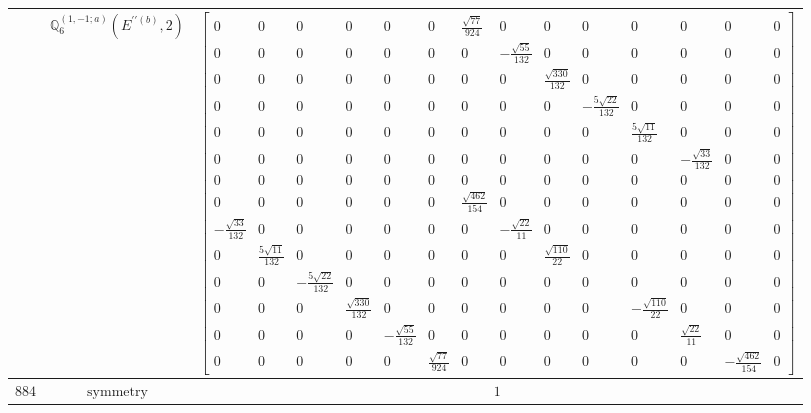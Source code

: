 \documentclass[fleqn,8pt,landscape]{jsarticle}
\begin{document}
\begin{longtable}{ccc}
$  $ & $ \mathbb{Q}_{6}^{(1,-1;a)}(E^{\prime\prime(b)},2) $ & $ \begin{bmatrix} 0 & 0 & 0 & 0 & 0 & 0 & \frac{\sqrt{77}}{924} & 0 & 0 & 0 & 0 & 0 & 0 & 0 \\ 0 & 0 & 0 & 0 & 0 & 0 & 0 & - \frac{\sqrt{55}}{132} & 0 & 0 & 0 & 0 & 0 & 0 \\ 0 & 0 & 0 & 0 & 0 & 0 & 0 & 0 & \frac{\sqrt{330}}{132} & 0 & 0 & 0 & 0 & 0 \\ 0 & 0 & 0 & 0 & 0 & 0 & 0 & 0 & 0 & - \frac{5 \sqrt{22}}{132} & 0 & 0 & 0 & 0 \\ 0 & 0 & 0 & 0 & 0 & 0 & 0 & 0 & 0 & 0 & \frac{5 \sqrt{11}}{132} & 0 & 0 & 0 \\ 0 & 0 & 0 & 0 & 0 & 0 & 0 & 0 & 0 & 0 & 0 & - \frac{\sqrt{33}}{132} & 0 & 0 \\ 0 & 0 & 0 & 0 & 0 & 0 & 0 & 0 & 0 & 0 & 0 & 0 & 0 & 0 \\ 0 & 0 & 0 & 0 & 0 & 0 & \frac{\sqrt{462}}{154} & 0 & 0 & 0 & 0 & 0 & 0 & 0 \\ - \frac{\sqrt{33}}{132} & 0 & 0 & 0 & 0 & 0 & 0 & - \frac{\sqrt{22}}{11} & 0 & 0 & 0 & 0 & 0 & 0 \\ 0 & \frac{5 \sqrt{11}}{132} & 0 & 0 & 0 & 0 & 0 & 0 & \frac{\sqrt{110}}{22} & 0 & 0 & 0 & 0 & 0 \\ 0 & 0 & - \frac{5 \sqrt{22}}{132} & 0 & 0 & 0 & 0 & 0 & 0 & 0 & 0 & 0 & 0 & 0 \\ 0 & 0 & 0 & \frac{\sqrt{330}}{132} & 0 & 0 & 0 & 0 & 0 & 0 & - \frac{\sqrt{110}}{22} & 0 & 0 & 0 \\ 0 & 0 & 0 & 0 & - \frac{\sqrt{55}}{132} & 0 & 0 & 0 & 0 & 0 & 0 & \frac{\sqrt{22}}{11} & 0 & 0 \\ 0 & 0 & 0 & 0 & 0 & \frac{\sqrt{77}}{924} & 0 & 0 & 0 & 0 & 0 & 0 & - \frac{\sqrt{462}}{154} & 0 \end{bmatrix} $ \\ \hline
$ 884 $ & $ \text{symmetry} $ & $ 1 $ \\

\end{longtable}
\end{document}
